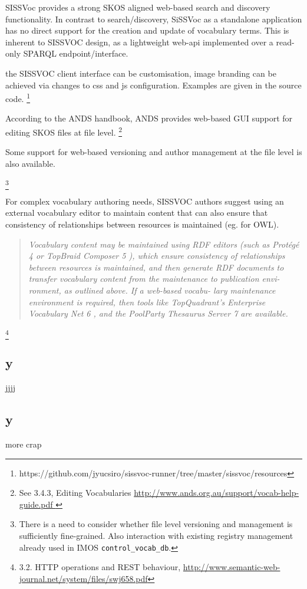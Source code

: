 \documentclass[10pt,a4paper]{article}
\newenvironment{italicquotes}
{\begin{quote}\itshape}
{\end{quote}}
\begin{document}
\begin{flushleft}
  SISSVoc provides a strong SKOS aligned web-based search and discovery functionality. In 
  contrast to search/discovery, SiSSVoc as a standalone application has no direct 
  support for the creation and update of vocabulary terms. This is inherent to SISSVOC design, as a 
  lightweight web-api implemented over a read-only SPARQL endpoint/interface.  

  the SISSVOC client interface can be customisation, image branding
  can be achieved via changes to css and js configuration.
  Examples are given in the source code.
   \footnote {
      https://github.com/jyucsiro/sissvoc-runner/tree/master/sissvoc/resources
    }
    
  According to the ANDS handbook, ANDS provides web-based GUI support for editing SKOS files at file level. 
  \footnote { See 3.4.3, Editing Vocabularies \url{ http://www.ands.org.au/support/vocab-help-guide.pdf } 
  }

  Some support for web-based versioning and author management at the file level
  is also available. 

  \footnote {
    There is a need to consider whether file level versioning and management is
  sufficiently fine-grained. Also interaction with existing registry management
  already used in IMOS \texttt{control\_vocab\_db}. 
  }
  
 
  For complex vocabulary authoring needs, SISSVOC authors suggest using an
external vocabulary editor to maintain content that can also ensure that consistency of
relationships between resources is maintained (eg. for OWL). 

  \begin{italicquotes} 
  Vocabulary content may be maintained using RDF editors (such as Protégé 4 or
TopBraid Composer 5 ), which ensure consistency of
relationships between resources is maintained, and
then generate RDF documents to transfer vocabulary
content from the maintenance to publication envi-
ronment, as outlined above. If a web-based vocabu-
lary maintenance environment is required, then tools
like TopQuadrant’s Enterprise Vocabulary Net 6 , and
the PoolParty Thesaurus Server 7 are available.
  \end{italicquotes} 

  \footnote {
    3.2. HTTP operations and REST behaviour, 
\url{http://www.semantic-web-journal.net/system/files/swj658.pdf} 
  }


\subsection{y}







jjjj
\subsection{y}
  more crap






  \end{flushleft}
\end{document}
